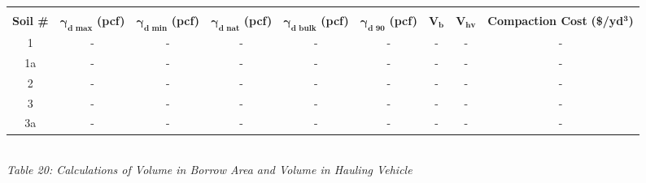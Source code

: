 \documentclass{article}
\begin{document}
\begin{center}
    \vspace{7mm}
    \begin{tabular}{|c|cccccccc|}
        \hline
        &&&&&&&&\\
        \textbf{Soil \#} & \shortstack[c]{\textbf{$\bm{\gamma_{d\text{ max}}}$}\\\textbf{(pcf)}} & \shortstack[c]{\textbf{$\bm{\gamma_{d\text{ min}}}$}\\\textbf{(pcf)}} & \shortstack[c]{\textbf{$\bm{\gamma_{d\text{ nat}}}$}\\\textbf{(pcf)}} & \shortstack[c]{\textbf{$\bm{\gamma_{d\text{ bulk}}}$}\\\textbf{(pcf)}} & \shortstack[c]{\textbf{$\bm{\gamma_{d\text{ 90}}}$}\\\textbf{(pcf)}} & $\bm{V_b}$ & $\bm{V_{hv}}$ & \shortstack[c]{\textbf{Compaction Cost}\\ \textbf{(\$/yd$\bm{^3}$)}}  \\\hline
        1               & -                                          & -                                          & -                                          & -                                           & -                                         & -            & -               & -                                         \\
        1a              & -                                          & -                                          & -                                          & -                                           & -                                         & -            & -               & -                                         \\
        2               & -                                          & -                                          & -                                          & -                                           & -                                         & -            & -               & -                                         \\
        3               & -                                          & -                                          & -                                          & -                                           & -                                         & -            & -               & -                                         \\
        3a              & -                                          & -                                          & -                                          & -                                           & -                                         & -            & -               & -                               \\\hline         
    \end{tabular}
    \vspace{3mm}
    \emph{\\Table 20: Calculations of Volume in Borrow Area and Volume in Hauling Vehicle\\}



\end{center}
\end{document}
